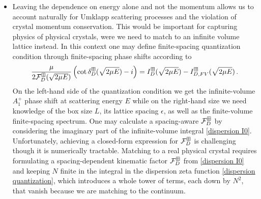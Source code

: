 \begin{itemize}
\item Leaving the dependence on energy alone and not the momentum allows us to account naturally for Umklapp scattering processes and the violation of crystal momentum conservation.
This would be important for capturing physics of physical crystals, were we need to match to an infinite volume lattice instead.
In this context one may define finite-spacing quantization condition through finite-spacing phase shifts according to
\begin{equation}
    \frac{\mu}{2 \mathcal{F}_D^\boxplus(\sqrt{2\mu E})}\left(\cot\delta_D^\boxplus(\sqrt{2\mu E})-i\right)
    =
    I_D^{\boxplus}(\sqrt{2\mu E}) - I_{D,FV}^{\boxplus}(\sqrt{2\mu E})
	\, .
\end{equation}
On the left-hand side of the quantization condition we get the infinite-volume $A_1^+$ phase shift at scattering energy $E$ while on the right-hand size we need knowledge of the box size $L$, its lattice spacing $\epsilon$, as well as the finite-volume finite-spacing spectrum.
One may calculate a spacing-aware $\mathcal{F}_D^\boxplus$ by considering the imaginary part of the infinite-volume integral \eqref{dispersion I0}.
Unfortunately, achieving a closed-form expression for $\mathcal{F}_D^\boxplus$ is challenging though it is numerically tractable.
Matching to a real physical crystal requires formulating a spacing-dependent kinematic factor $\mathcal{F}_D^\boxplus$ from \eqref{dispersion I0} and keeping $N$ finite in the integral in the dispersion zeta function \eqref{dispersion quantization}, which introduces a whole tower of terms, each down by $N^2$, that vanish because we are matching to the continuum.
\end{itemize}
